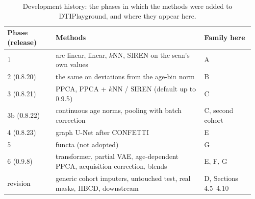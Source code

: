 \documentclass[11pt]{article}
\begin{document}
\begin{table}[h]
\centering\footnotesize
\caption{Development history: the phases in which the methods were added to DTIPlayground, and where they appear
here.}\label{tab:phases}
\begin{tabular}{lp{9.5cm}p{3.2cm}}
\toprule
Phase (release) & Methods & Family here \\
\midrule
1 & arc-linear, linear, $k$NN, SIREN on the scan's own values & A \\
2 (0.8.20) & the same on deviations from the age-bin norm & B \\
3 (0.8.21) & PPCA, PPCA + $k$NN / SIREN (default up to 0.9.5) & C \\
3b (0.8.22) & continuous age norms, pooling with batch correction & C, second cohort \\
4 (0.8.23) & graph U-Net after CONFETTI & E \\
5 & functa (not adopted) & G \\
6 (0.9.8) & transformer, partial VAE, age-dependent PPCA, acquisition correction, blends & E, F, G \\
revision & generic cohort imputers, untouched test, real masks, HBCD, downstream & D, Sections 4.5--4.10 \\
\bottomrule
\end{tabular}
\end{table}

\begin{table}[h]
\centering\footnotesize
\caption{Generic cohort imputers (E8) on the hidden values of seeds 0--2 (same training scans per fold as PPCA), with
the paired whole-profile ratio against PPCA alone (95\% subject-bootstrap CI).}\label{tab:baselines}
\resizebox{\textwidth}{!}{}
\end{table}

\begin{table}[h]
\centering\footnotesize
\caption{Distance limit of the local methods under the current protocol: the local method fills cells up to the limit,
PPCA beyond (normalized squared errors of the same cells pooled over age bins, relative to the age-bin mean; mean over
measures).}\label{tab:cap}

\end{table}

\begin{table}[h]
\centering\footnotesize
\caption{Absolute RMSE of the main settings (four patterns; mean over patterns, age bins and seeds); FA, NDI, ODI, FWF
$\times10^{3}$, MD, RD, AD $\times10^{6}$\,mm$^2$/s.}\label{tab:absall}

\end{table}
\end{document}

